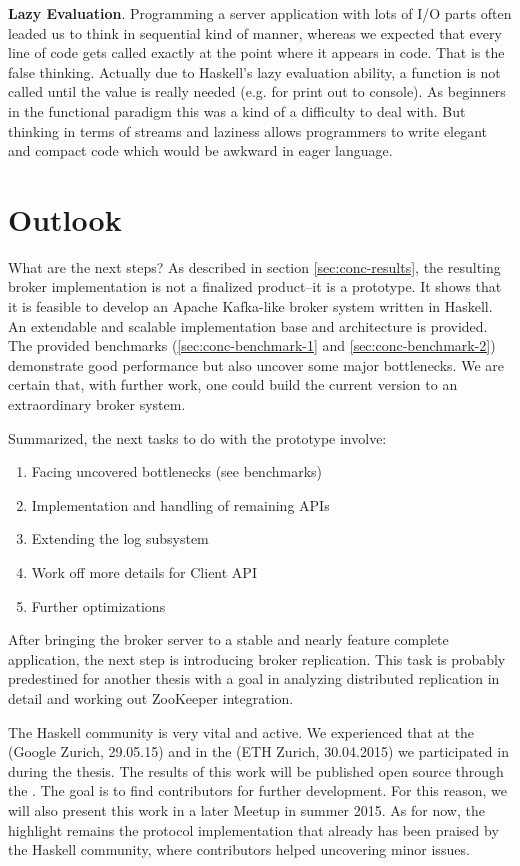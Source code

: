 {\bf Lazy Evaluation}. Programming a server application with lots of I/O parts
often leaded us to think in sequential kind of manner, whereas we expected that
every line of code gets called exactly at the point where it appears in code.
That is the false thinking.  Actually due to Haskell's lazy evaluation ability,
a function is not called until the value is really needed (e.g. for print out
to console). As beginners in the functional paradigm this was a kind of a
difficulty to deal with. But thinking in terms of streams and laziness allows
programmers to write elegant and compact code which would be awkward in eager
language.





\newpage
\section{Outlook}

What are the next steps? As described in section \ref{sec:conc-results}, the
resulting broker implementation is not a finalized product--it is a prototype.
It shows that it is feasible to develop an Apache Kafka-like broker system
written in Haskell. An extendable and scalable implementation base and
architecture is provided. The provided benchmarks (\ref{sec:conc-benchmark-1}
and \ref{sec:conc-benchmark-2}) demonstrate good performance but also uncover
some major bottlenecks. We are certain that, with further work, one could build
the current version to an extraordinary broker system.

Summarized, the next tasks to do with the prototype involve:
\begin{enumerate}
    \item Facing uncovered bottlenecks (see benchmarks)
    \item Implementation and handling of remaining APIs
    \item Extending the log subsystem
    \item Work off more details for Client API
    \item Further optimizations
\end{enumerate}

After bringing the broker server to a stable and nearly feature complete
application, the next step is introducing broker replication. This task
is probably predestined for another thesis with a goal in analyzing
distributed replication in detail and working out ZooKeeper
integration.

The Haskell community is very vital and active. We experienced that at the
 (Google Zurich,
29.05.15) and in the 
(ETH Zurich, 30.04.2015) we participated in during the thesis. The results
of this work will be published open source through the . The goal is to find contributors for
further development. For this reason, we will also present this work in a
later Meetup in summer 2015. As for now, the highlight remains the
protocol implementation that already has been praised by the Haskell community, where
contributors helped uncovering minor issues.

